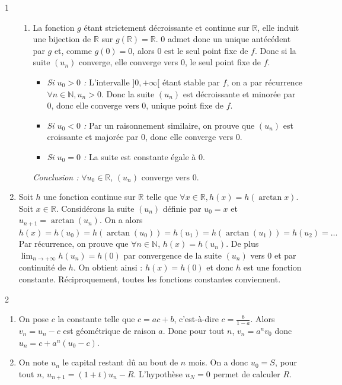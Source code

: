\begin{correction}{1}
\begin{enumerate}
\begin{enumerate}
        \item 
        La fonction $g$ étant strictement décroissante et continue sur $\mathbb{R}$, elle induit une bijection de $\mathbb{R}$ sur $g(\mathbb{R})=\mathbb{R}$.
        $0$ admet donc un unique antécédent par $g$ et, comme $g(0)=0$, alors 0 est le seul point fixe de $f$.
        Donc si la suite $(u_{n})$ converge, elle converge vers 0, le seul point fixe de $f$.
        \begin{itemize}
            \item \textit{Si $u_{0}>0$ :} L'intervalle $]0,+\infty[$ étant stable par $f$, on a par récurrence $\forall n\in\mathbb{N}, u_{n}>0$. Donc la suite $(u_{n})$ est décroissante et minorée par 0, donc elle converge vers 0, unique point fixe de $f$.
            \item \textit{Si $u_{0}<0$ :} Par un raisonnement similaire, on prouve que $(u_{n})$ est croissante et majorée par 0, donc elle converge vers 0.
            \item \textit{Si $u_{0}=0$ :} La suite est constante égale à 0.
        \end{itemize}

        \textit{Conclusion :} $\forall u_{0}\in\mathbb{R}$, $(u_{n})$ converge vers 0.
    \end{enumerate}

    \item 
    Soit $h$ une fonction continue sur $\mathbb{R}$ telle que $\forall x\in\mathbb{R}, h(x)=h(\arctan x)$.
    Soit $x\in\mathbb{R}$. Considérons la suite $(u_{n})$ définie par $u_{0}=x$ et $u_{n+1}=\arctan(u_{n})$.
    On a alors $h(x)=h(u_{0})=h(\arctan(u_{0}))=h(u_{1})=h(\arctan(u_{1}))=h(u_{2})=\dots$
    Par récurrence, on prouve que $\forall n\in\mathbb{N}$, $h(x)=h(u_{n})$.
    De plus $\lim_{n\rightarrow+\infty}h(u_{n})=h(0)$ par convergence de la suite $(u_{n})$ vers 0 et par continuité de $h$.
    On obtient ainsi : $h(x)=h(0)$ et donc $h$ est une fonction constante.
    Réciproquement, toutes les fonctions constantes conviennent.
\end{enumerate}


\end{correction}

\begin{correction}{2}
\begin{enumerate}
    \item 
    On pose $c$ la constante telle que $c=ac+b$, c'est-à-dire $c=\frac{b}{1-a}$.
    Alors $v_{n}=u_{n}-c$ est géométrique de raison $a$.
    Donc pour tout $n$, $v_{n}=a^{n}v_{0}$ donc $u_{n}=c+a^{n}(u_{0}-c)$.

    \item 
    On note $u_{n}$ le capital restant dû au bout de $n$ mois.
    On a donc $u_{0}=S$, pour tout $n$, $u_{n+1}=(1+t)u_{n}-R$.
    L'hypothèse $u_{N}=0$ permet de calculer $R$.
\end{enumerate}
\end{correction}

